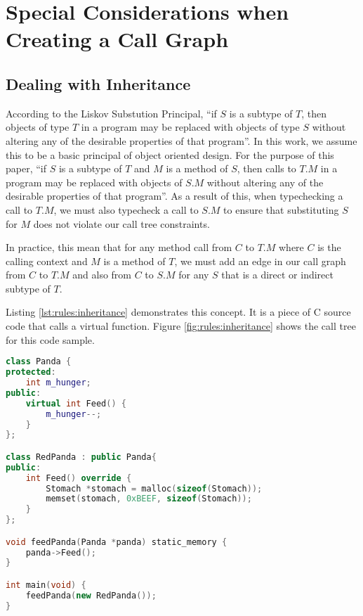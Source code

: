\section{Special Considerations when Creating a Call Graph}\label{sec:rules:special}

\subsection{Dealing with Inheritance}\label{sec:rules:inherit}

According to the Liskov Substution Principal, ``if $S$ is a subtype of $T$, then objects of type $T$ in a program may be replaced with objects of type $S$ without altering any of the desirable properties of that program''.  In this work, we assume this to be a basic principal of object oriented design.  For the purpose of this paper, ``if $S$ is a subtype of $T$ and $M$ is a method of $S$, then calls to $T.M$ in a program may be replaced with objects of $S.M$ without altering any of the desirable properties of that program''.  As a result of this, when typechecking a call to $T.M$, we must also typecheck a call to $S.M$ to ensure that substituting $S$ for $M$ does not violate our call tree constraints.

In practice, this mean that for any method call from $C$ to $T.M$ where $C$ is the calling context and $M$ is a method of $T$, we must add an edge in our call graph from $C$ to $T.M$ and also from $C$ to $S.M$ for any $S$ that is a direct or indirect subtype of $T$.  

Listing \ref{lst:rules:inheritance} demonstrates this concept.  It is a piece of C source code that calls a virtual function.  Figure \ref{fig:rules:inheritance} shows the call tree for this code sample.  

\noindent\begin{minipage}[t]{\linewidth}
\begin{lstlisting}[language=C++,caption={Example C program demonstrating inheritance.  In \lstinline{feedPanda}, it is impossible to know statically which instance of the \lstinline{Feed} function will be called.  Figure \ref{fig:rules:inheritance} shows the call graph for this program.},label={lst:rules:inheritance}]
class Panda {
protected:
    int m_hunger;
public:
    virtual int Feed() {
        m_hunger--;
    }
};

class RedPanda : public Panda{
public:
    int Feed() override {
        Stomach *stomach = malloc(sizeof(Stomach));
        memset(stomach, 0xBEEF, sizeof(Stomach));
    }
};

void feedPanda(Panda *panda) static_memory {
    panda->Feed();
}

int main(void) {
    feedPanda(new RedPanda());
}
\end{lstlisting}
\end{minipage}

